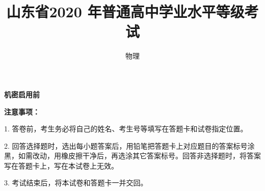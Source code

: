 \documentclass[list,mac]{BHCexam}
\begin{document}
\textbf{机密启用前} 
\title{山东省2020 年普通高中学业水平等级考试}
\subtitle{物理}
\maketitle

\textbf{注意事项：} 
\setlength\parindent{2em}

1. 答卷前，考生务必将自己的姓名、考生号等填写在答题卡和试卷指定位置。

2. 回答选择题时，选出每小题答案后，用铅笔把答题卡上对应题目的答案标号涂黑，如需改动，用橡皮擦干净后，再选涂其它答案标号。回答非选择题时，将答案写在答题卡上，写在本试卷上无效。

3. 考试结束后，将本试卷和答题卡一并交回。

\begin{groups}


\begin{questions}[30s]

\end{questions}


\begin{questions}[p]

\end{questions}



\end{groups}
\label{lastpage}
\end{document}

